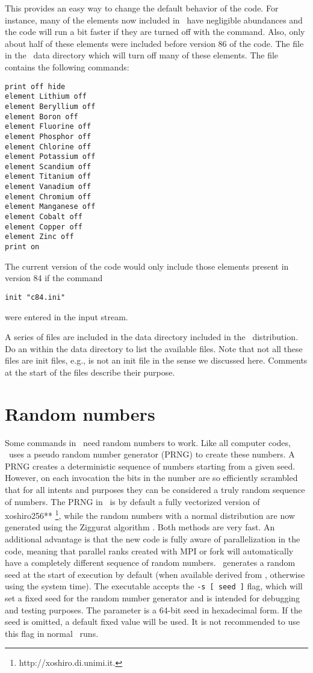 This provides an easy way to change the default behavior of the code.
For instance, many of the elements now included in \Cloudy\ have
negligible abundances and the code will run a bit faster
if they are turned off with
the  command.
Also, only about half of these
elements were included before version 86 of the code.
The file  in the \Cloudy\ data directory
which will turn off many of these elements.
The  file contains
the following commands:
\begin{verbatim}
print off hide
element Lithium off
element Beryllium off
element Boron off
element Fluorine off
element Phosphor off
element Chlorine off
element Potassium off
element Scandium off
element Titanium off
element Vanadium off
element Chromium off
element Manganese off
element Cobalt off
element Copper off
element Zinc off
print on
\end{verbatim}

The current version of the code would only include those elements present
in version 84 if the command
\begin{verbatim}
init "c84.ini"
\end{verbatim}
were entered in the input stream.

A series of  files are included in the
data directory included in the \Cloudy\ distribution.
Do an  within the data directory
to list the available files. Note that not all these files
are init files, e.g.,  is not
an init file in the sense we discussed here.
Comments at the start of the files describe
their purpose.

\section{Random numbers}

Some commands in \Cloudy\ need random numbers to work. Like all computer
codes, \Cloudy\ uses a pseudo random number generator (PRNG) to create these
numbers. A PRNG creates a deterministic sequence of numbers starting from a
given seed. However, on each invocation the bits in the number are so
efficiently scrambled that for all intents and purposes they can be considered
a truly random sequence of numbers. The PRNG in \Cloudy\ is by default a fully
vectorized version of xoshiro256** \citep{2018arXiv180501407B}
\footnote{http://xoshiro.di.unimi.it.}, while the random numbers with a
normal distribution are now generated using the Ziggurat algorithm
\citep{MarsagliaTsang00}. Both methods are very fast. An additional advantage
is that the new code is fully aware of parallelization in the code, meaning
that parallel ranks created with MPI or fork will automatically have a
completely different sequence of random numbers. \Cloudy\ generates a random
seed at the start of execution by default (when available derived from
, otherwise using the system time). The executable
accepts the {\tt -s~[~seed~]} flag, which will set a fixed seed for the random
number generator and is intended for debugging and testing purposes. The
parameter is a 64-bit seed in hexadecimal form. If the seed is omitted, a
default fixed value will be used. It is not recommended to use this flag in
normal \Cloudy\ runs.
